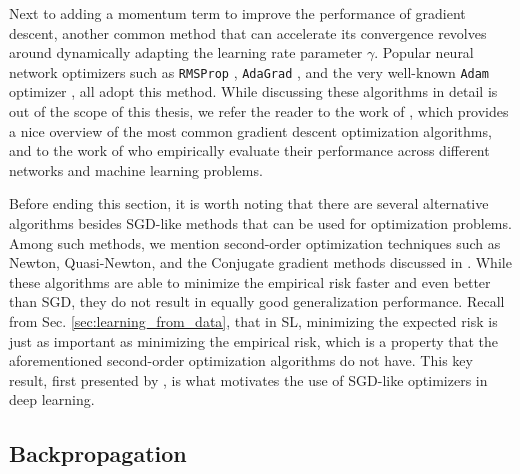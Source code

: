 Next to adding a momentum term to improve the performance of gradient descent, another common method that can accelerate its convergence revolves around dynamically adapting the learning rate parameter $\gamma$. Popular neural network optimizers such as \texttt{RMSProp} \cite{tieleman2012lecture}, \texttt{AdaGrad} \cite{duchi2011adaptive}, and the very well-known \texttt{Adam} optimizer \cite{kingma2014adam}, all adopt this method. While discussing these algorithms in detail is out of the scope of this thesis, we refer the reader to the work of \citet{ruder2016overview}, which provides a nice overview of the most common gradient descent optimization algorithms, and to the work of \citet{schmidt2020descending} who empirically evaluate their performance across different networks and machine learning problems. 

Before ending this section, it is worth noting that there are several alternative algorithms besides SGD-like methods that can be used for optimization problems. Among such methods, we mention second-order optimization techniques such as Newton, Quasi-Newton, and the Conjugate gradient methods discussed in \cite{tan2019review}. While these algorithms are able to minimize the empirical risk faster and even better than SGD, they do not result in equally good generalization performance. Recall from Sec. \ref{sec:learning_from_data}, that in SL, minimizing the expected risk is just as important as minimizing the empirical risk, which is a property that the aforementioned second-order optimization algorithms do not have. This key result, first presented by \citet{bottou201113}, is what motivates the use of SGD-like optimizers in deep learning.       

\subsection{Backpropagation}
\label{sec:backprop}

